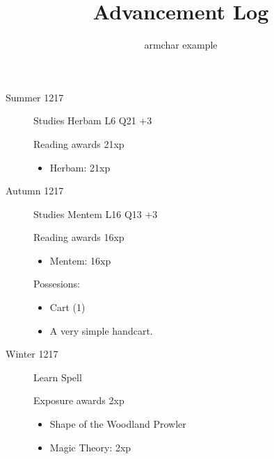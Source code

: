 \documentclass{scrartcl}
\title{Advancement Log}
\author{armchar example}
\begin{document}
\maketitle
\begin{description}
  \item[Summer 1217]
    Studies Herbam L6 Q21 +3

    Reading awards 21xp
    \begin{itemize}
      \item Herbam: 21xp
    \end{itemize}
  \item[Autumn 1217]
    Studies Mentem L16 Q13 +3

    Reading awards 16xp
    \begin{itemize}
      \item Mentem: 16xp
    \end{itemize}
    Possesions:
    \begin{itemize}
      \item Cart (1)
      \item A very simple handcart.
    \end{itemize}
  \item[Winter 1217]
    Learn Spell

    Exposure awards 2xp
    \begin{itemize}
      \item Shape of the Woodland Prowler
      \item Magic Theory: 2xp
    \end{itemize}
\end{description}
\end{document}

